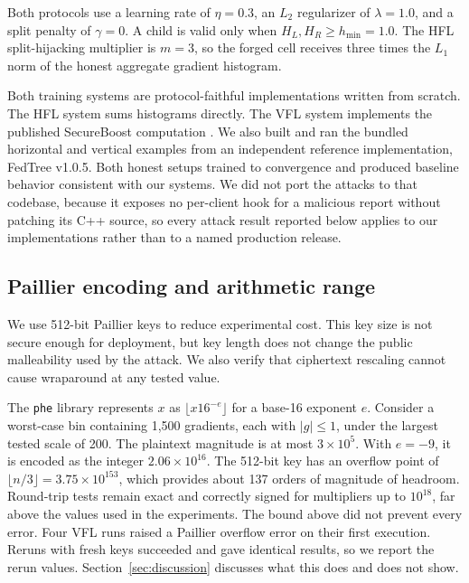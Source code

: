 \documentclass[11pt]{article}
\newcommand{\rev}[1]{#1}
\begin{document}
Both protocols use a learning rate of $\eta=0.3$, an $L_2$ regularizer of $\lambda=1.0$, and a split penalty of $\gamma=0$. A child is valid only when $H_L,H_R\geq h_{\min}=1.0$. The HFL split-hijacking multiplier is $m=3$, so the forged cell receives three times the $L_1$ norm of the honest aggregate gradient histogram.

Both training systems are protocol-faithful implementations written from scratch. The HFL system sums histograms directly. The VFL system implements the published SecureBoost computation \cite{cheng2021secureboost}. We also built and ran the bundled horizontal and vertical examples from an independent reference implementation\rev{, FedTree v1.0.5}. Both honest setups trained to convergence and produced baseline behavior consistent with our systems. We did not port the attacks to that codebase\rev{, because it exposes no per-client hook for a malicious report without patching its C++ source}, so every attack result reported below applies to our implementations rather than to a named production release.

\subsection{Paillier encoding and arithmetic range}

We use 512-bit Paillier keys to reduce experimental cost. This key size is not secure enough for deployment, but key length does not change the public malleability used by the attack. We also verify that ciphertext rescaling cannot cause wraparound at any tested value.

The \texttt{phe} library represents $x$ as $\lfloor x16^{-e}\rfloor$ for a base-16 exponent $e$. Consider a worst-case bin containing 1,500 gradients, each with $\lvert g\rvert\leq1$, under the largest tested scale of 200. The plaintext magnitude is at most $3\times10^5$. With $e=-9$, it is encoded as the integer $2.06\times10^{16}$. The 512-bit key has an overflow point of $\lfloor n/3\rfloor=3.75\times10^{153}$, which provides about 137 orders of magnitude of headroom. Round-trip tests remain exact and correctly signed for multipliers up to $10^{18}$, far above the values used in the experiments. \rev{The bound above did not prevent every error. Four VFL runs raised a Paillier overflow error on their first execution. Reruns with fresh keys succeeded and gave identical results, so we report the rerun values. Section~\ref{sec:discussion} discusses what this does and does not show.}
\end{document}
